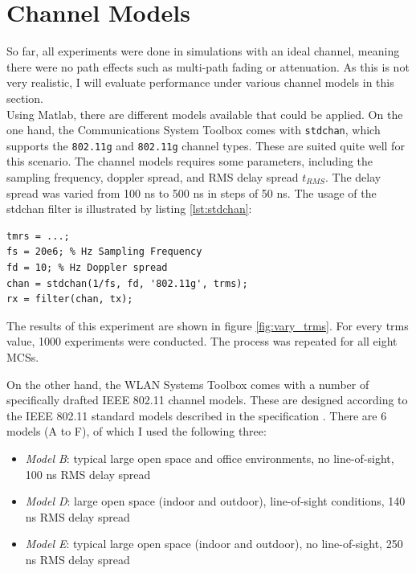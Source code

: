 
\section{Channel Models}

So far, all experiments were done in simulations with an ideal channel, meaning there were no path effects such as multi-path fading or attenuation. As this is not very realistic, I will evaluate performance under various channel models in this section.\\

Using Matlab, there are different models available that could be applied. On the one hand, the Communications System Toolbox comes with \texttt{stdchan}, which supports the \texttt{802.11g} and \texttt{802.11g} channel types. These are suited quite well for this scenario. The channel models requires some parameters, including the sampling frequency, doppler spread, and \gls{RMS} delay spread $ t_{RMS} $. The delay spread was varied from 100 ns to 500 ns in steps of 50 ns. The usage of the stdchan filter is illustrated by listing \ref{lst:stdchan}:

\begin{lstlisting}[captionpos=b,caption={Matlab stdchan Channel Model},label=lst:stdchan]
tmrs = ...;
fs = 20e6; % Hz Sampling Frequency
fd = 10; % Hz Doppler spread
chan = stdchan(1/fs, fd, '802.11g', trms);
rx = filter(chan, tx);
\end{lstlisting}

The results of this experiment are shown in figure \ref{fig:vary_trms}. For every trms value, 1000 experiments were conducted. The process was repeated for all eight \glspl{MCS}.

On the other hand, the WLAN Systems Toolbox comes with a number of specifically drafted IEEE 802.11 channel models. These are designed according to the IEEE 802.11 standard models described in the specification \cite{ieee2012}. There are 6 models (A to F), of which I used the following three:

\begin{itemize}
	\item \textit{Model B}: typical large open space and office environments, no line-of-sight, 100 ns RMS delay spread
	\item \textit{Model D}: large open space (indoor and outdoor), line-of-sight conditions, 140 ns RMS delay spread
	\item \textit{Model E}: typical large open space (indoor and outdoor), no line-of-sight, 250 ns RMS delay spread
\end{itemize}

